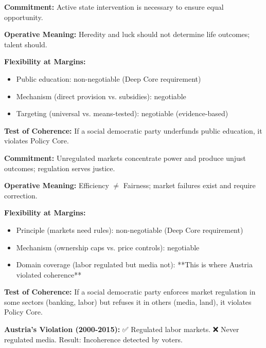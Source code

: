 \begin{tcolorbox}[colback=blue!5!white, colframe=blue!75!black,
    title=Policy Core Belief 7: Intervention for Opportunity]

\textbf{Commitment:} Active state intervention is necessary to ensure equal opportunity.

\textbf{Operative Meaning:} Heredity and luck should not determine life outcomes; talent should.

\textbf{Flexibility at Margins:}
\begin{itemize}[nosep]
\item Public education: non-negotiable (Deep Core requirement)
\item Mechanism (direct provision vs. subsidies): negotiable
\item Targeting (universal vs. means-tested): negotiable (evidence-based)
\end{itemize}

\textbf{Test of Coherence:} If a social democratic party underfunds public education, it violates Policy Core.

\end{tcolorbox}

\begin{tcolorbox}[colback=blue!5!white, colframe=blue!75!black,
    title=Policy Core Belief 8: Markets Require Regulation]

\textbf{Commitment:} Unregulated markets concentrate power and produce unjust outcomes; regulation serves justice.

\textbf{Operative Meaning:} Efficiency $\neq$ Fairness; market failures exist and require correction.

\textbf{Flexibility at Margins:}
\begin{itemize}[nosep]
\item Principle (markets need rules): non-negotiable (Deep Core requirement)
\item Mechanism (ownership caps vs. price controls): negotiable
\item Domain coverage (labor regulated but media not): **This is where Austria violated coherence**
\end{itemize}

\textbf{Test of Coherence:} If a social democratic party enforces market regulation in some sectors (banking, labor) but refuses it in others (media, land), it violates Policy Core.

\textbf{Austria's Violation (2000-2015):} ✅ Regulated labor markets. ❌ Never regulated media. Result: Incoherence detected by voters.

\end{tcolorbox}

